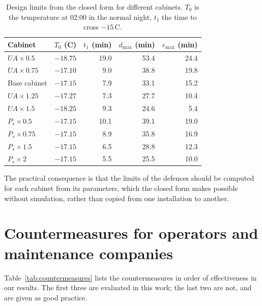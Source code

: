\documentclass{ceurart}
\newcommand{\degC}{\,\textdegree{}C}
\begin{document}
\begin{table}[ht]
  \caption{Design limits from the closed form for different cabinets. $T_0$ is the temperature at 02:00 in the normal night, $t_1$ the time to cross $-15$\degC.}
  \label{tab:limits}
  \begin{tabular}{@{}lrrrr@{}}
    \toprule
    Cabinet & $T_0$ (\textdegree{}C) & $t_1$ (min) & $d_{\max}$ (min) & $r_{\max}$ (min) \\
    \midrule
    $UA \times 0.5$ & $-18.75$ & 19.0 & 53.4 & 24.4 \\
    $UA \times 0.75$ & $-17.10$ & 9.0 & 38.8 & 19.8 \\
    Base cabinet & $-17.15$ & 7.9 & 33.1 & 15.2 \\
    $UA \times 1.25$ & $-17.27$ & 7.3 & 27.7 & 10.4 \\
    $UA \times 1.5$ & $-18.25$ & 9.3 & 24.6 & 5.4 \\
    $P_s \times 0.5$ & $-17.15$ & 10.1 & 39.1 & 19.0 \\
    $P_s \times 0.75$ & $-17.15$ & 8.9 & 35.8 & 16.9 \\
    $P_s \times 1.5$ & $-17.15$ & 6.5 & 28.8 & 12.3 \\
    $P_s \times 2$ & $-17.15$ & 5.5 & 25.5 & 10.0 \\
    \bottomrule
  \end{tabular}
\end{table}

The practical consequence is that the limits of the defences should be computed for each cabinet from its parameters, which the closed form makes possible without simulation, rather than copied from one installation to another.

\section{Countermeasures for operators and maintenance companies}
\label{sec:countermeasures}

Table~\ref{tab:countermeasures} lists the countermeasures in order of effectiveness in our results.
The first three are evaluated in this work; the last two are not, and are given as good practice.
\end{document}

